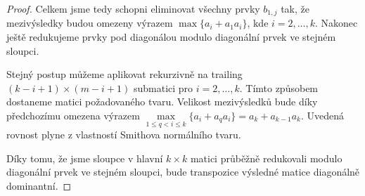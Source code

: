 \begin{proof}
Celkem jsme tedy schopni eliminovat všechny prvky $ b_{1,j} $ tak, že 
mezivýsledky budou omezeny výrazem $ \max\{ a_i + a_1 a_i \} $, kde 
$ i = 2,\dots,k $. Nakonec ještě redukujeme prvky pod diagonálou modulo 
diagonální prvek ve stejném sloupci.

Stejný postup můžeme aplikovat rekurzivně na trailing
$ (k - i + 1) \times (m - i + 1) $ submatici pro $ i = 2,\dots, k $. Tímto 
způsobem dostaneme matici požadovaného tvaru. Velikost mezivýsledků bude 
díky předchozímu omezena výrazem 
$ \max\limits_{1 \leq q < i \leq k}\{ a_i + a_q a_i \} = a_k + a_{k - 1} a_k $.
Uvedená rovnost plyne z vlastností Smithova normálního tvaru. 

Díky tomu, že jsme sloupce v hlavní $ k \times k $ matici průběžně redukovali
modulo diagonální prvek ve stejném sloupci, bude transpozice výsledné matice 
diagonálně dominantní.
\end{proof}

